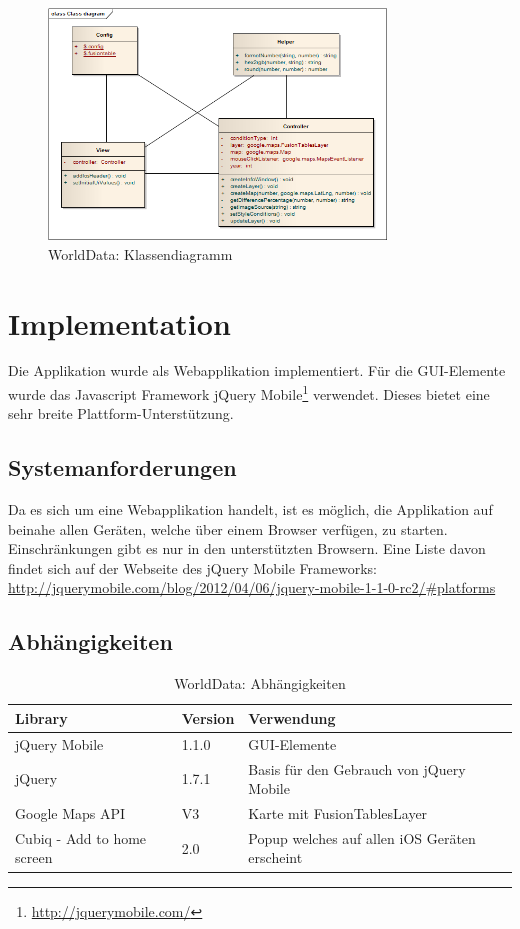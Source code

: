 \begin{figure}[H]
	\centering
	\includegraphics[width=0.8\textwidth]{images/usecase1-worlddata/uml/worlddata-classdiagram}
	\caption{WorldData: Klassendiagramm}
	\label{worlddata-classdiagram}
\end{figure}

\section{Implementation}
Die Applikation wurde als Webapplikation implementiert. Für die GUI-Elemente wurde das Javascript Framework jQuery Mobile\footnote{\url{http://jquerymobile.com/}} verwendet. Dieses bietet eine sehr breite Plattform-Unterstützung.

\subsection{Systemanforderungen}
Da es sich um eine Webapplikation handelt, ist es möglich, die Applikation auf beinahe allen Geräten, welche über einem Browser verfügen, zu starten. Einschränkungen gibt es nur in den unterstützten Browsern. Eine Liste davon findet sich auf der Webseite des jQuery Mobile Frameworks: \url{http://jquerymobile.com/blog/2012/04/06/jquery-mobile-1-1-0-rc2/#platforms}

\subsection{Abhängigkeiten}
\begin{table}[H]
\centering
\begin{tabular}{|p{0.35\threecelltabwidth}|p{0.11\threecelltabwidth}|p{0.54\threecelltabwidth}|}
\hline 
\textbf{Library} & \textbf{Version} & \textbf{Verwendung} \\ 
\hline 
jQuery Mobile & 1.1.0 & GUI-Elemente \\ 
\hline 
jQuery & 1.7.1 & Basis für den Gebrauch von jQuery Mobile \\ 
\hline 
Google Maps \gls{API} & V3 & Karte mit FusionTablesLayer \\ 
\hline 
Cubiq - Add to home screen & 2.0 & Popup welches auf allen iOS Geräten erscheint \\ 
\hline 
\end{tabular}
\caption{WorldData: Abhängigkeiten}
\end{table} 


